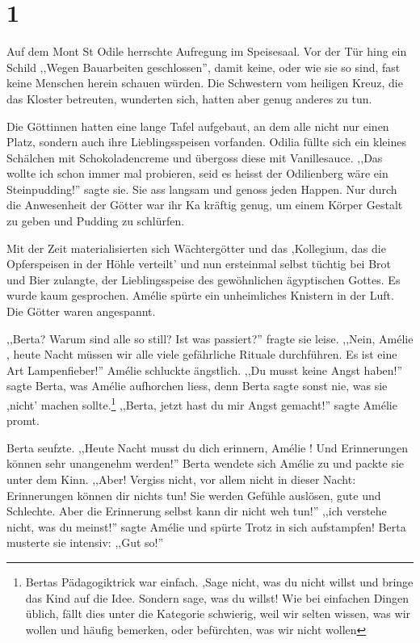 \documentclass[11pt,titlepage,a5paper]{book}
\newcommand{\am}{Amélie }
\begin{document}
\section*{1}

Auf dem Mont St Odile herrschte Aufregung im Speisesaal. Vor der Tür hing ein Schild ,,Wegen Bauarbeiten geschlossen'', damit keine, oder wie sie so sind, fast keine Menschen herein schauen würden. Die Schwestern vom heiligen Kreuz, die das Kloster betreuten, wunderten sich, hatten aber genug anderes zu tun.

Die Göttinnen hatten eine lange Tafel aufgebaut, an dem alle nicht nur einen Platz, sondern auch ihre Lieblingsspeisen vorfanden. Odilia füllte sich ein kleines Schälchen mit Schokoladencreme und übergoss diese mit Vanillesauce. ,,Das wollte ich schon immer mal probieren, seid es heisst der Odilienberg wäre ein Steinpudding!'' sagte sie. Sie ass langsam und genoss jeden Happen. Nur durch die Anwesenheit der Götter war ihr Ka kräftig genug, um einem Körper Gestalt zu geben und Pudding zu schlürfen.

Mit der Zeit materialisierten sich Wächtergötter und das ,Kollegium, das die Opferspeisen in der Höhle verteilt' und nun ersteinmal selbst tüchtig bei Brot und Bier zulangte, der Lieblingsspeise des gewöhnlichen ägyptischen Gottes. Es wurde kaum gesprochen. \am spürte ein unheimliches Knistern in der Luft. Die Götter waren angespannt. 

,,Berta? Warum sind alle so still? Ist was passiert?'' fragte sie leise. ,,Nein, \am , heute Nacht müssen wir alle viele gefährliche Rituale durchführen. Es ist eine Art Lampenfieber!'' \am schluckte ängstlich. ,,Du musst keine Angst haben!'' sagte Berta, was \am aufhorchen liess, denn Berta sagte sonst nie, was sie ,nicht' machen sollte.\footnote{Bertas Pädagogiktrick war einfach. ,Sage nicht, was du nicht willst und bringe das Kind auf die Idee. Sondern sage, was du willst! Wie bei einfachen Dingen üblich, fällt dies unter die Kategorie schwierig, weil wir selten wissen, was wir wollen und häufig bemerken, oder befürchten, was wir nicht wollen} ,,Berta, jetzt hast du mir Angst gemacht!'' sagte \am promt.

Berta seufzte. ,,Heute Nacht musst du dich erinnern, \am ! Und Erinnerungen können sehr unangenehm werden!'' Berta wendete sich \am zu und packte sie unter dem Kinn. ,,Aber! Vergiss nicht, vor allem nicht in dieser Nacht: Erinnerungen können dir nichts tun! Sie werden Gefühle auslösen, gute und Schlechte. Aber die Erinnerung selbst kann dir nicht weh tun!'' ,,ich verstehe nicht, was du meinst!'' sagte \am und spürte Trotz in sich aufstampfen! Berta musterte sie intensiv: ,,Gut so!''
\end{document}
